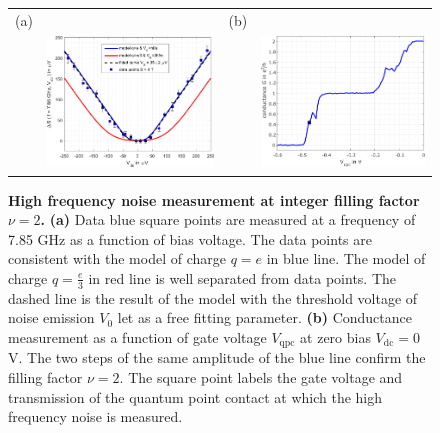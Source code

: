 \begin{figure}[hptb]
	\begin{center}
		\begin{tabular}{c c c c}
			(a) & & (b) & \\
			& \includegraphics[width = 6.5 cm]{./chap2/nu_2_RF_noise_vs_Vdc_at_7_85GHz} &
			& \includegraphics[width = 6.25 cm]{./chap2/qpc_step_nu_2}
		\end{tabular}
	\end{center}
	
	\caption{\textbf{High frequency noise measurement at integer filling factor $\nu = 2$.} \textbf{(a)} Data blue square points are measured at a frequency of 7.85 GHz as a function of bias voltage. The data points are consistent with the model of charge $q = e$ in blue line. The model of charge $q = \frac{e}{3}$ in red line is well separated from data points. The dashed line is the result of the model with the threshold voltage of noise emission $V_{0}$ let as a free fitting parameter. \textbf{(b)} Conductance measurement as a function of gate voltage $V_{\mathrm{qpc}}$ at zero bias $V_{\mathrm{dc}} = 0$ V. The two steps of the same amplitude of the blue line confirm the filling factor $\nu = 2$. The square point labels the gate voltage and transmission of the quantum point contact at which the high frequency noise is measured.}
	\label{fig: RF charac at 2}
\end{figure}

